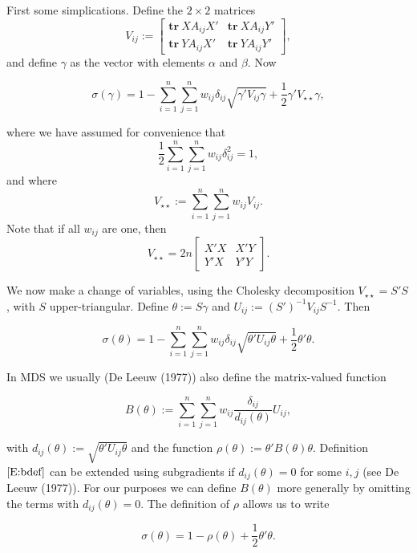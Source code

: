 \documentclass[12pt,]{article}
\begin{document}
First some simplications. Define the \(2\times 2\) matrices \[
V_{ij}:=\begin{bmatrix}\mathbf{tr}\ XA_{ij}X'&\mathbf{tr}\ XA_{ij}Y'\\\mathbf{tr}\ YA_{ij}X'&\mathbf{tr}\ YA_{ij}Y'\end{bmatrix},
\] and define \(\gamma\) as the vector with elements \(\alpha\) and
\(\beta\). Now

\begin{equation}
\sigma(\gamma)=1-\sum_{i=1}^n\sum_{j=1}^nw_{ij}\delta_{ij}\sqrt{\gamma'V_{ij}\gamma}+\frac12\gamma'V_{\star\star}\gamma,\label{E:gamma}
\end{equation}

where we have assumed for convenience that \[
\frac12\sum_{i=1}^n\sum_{j=1}^nw_{ij}\delta_{ij}^2=1,
\] and where \[
V_{\star\star}:=\sum_{i=1}^n\sum_{j=1}^n w_{ij}V_{ij}.
\] Note that if all \(w_{ij}\) are one, then \[
V_{\star\star}=2n\begin{bmatrix}X'X&X'Y\\Y'X&Y'Y\end{bmatrix}.
\]

We now make a change of variables, using the Cholesky decomposition
\(V_{\star\star}=S'S\), with \(S\) upper-triangular. Define
\(\theta:=S\gamma\) and \(U_{ij}:=(S')^{-1}V_{ij}S^{-1}\). Then

\begin{equation}
\sigma(\theta)=1-\sum_{i=1}^n\sum_{j=1}^nw_{ij}\delta_{ij}\sqrt{\theta'U_{ij}\theta}+\frac12\theta'\theta.\label{E:theta}
\end{equation}

In MDS we usually (De Leeuw (1977)) also define the matrix-valued
function

\begin{equation}
B(\theta):=\sum_{i=1}^n\sum_{j=1}^nw_{ij}\frac{\delta_{ij}}{d_{ij}(\theta)}U_{ij},\label{E:bdef}
\end{equation}

with \(d_{ij}(\theta):=\sqrt{\theta'U_{ij}\theta}\) and the function
\(\rho(\theta):=\theta'B(\theta)\theta\). Definition \(\eqref{E:bdef}\)
can be extended using subgradients if \(d_{ij}(\theta)=0\) for some
\(i,j\) (see De Leeuw (1977)). For our purposes we can define
\(B(\theta)\) more generally by omitting the terms with
\(d_{ij}(\theta)=0\). The definition of \(\rho\) allows us to write

\begin{equation}
\sigma(\theta)=1-\rho(\theta)+\frac12\theta'\theta.\label{E:short}
\end{equation}
\end{document}
